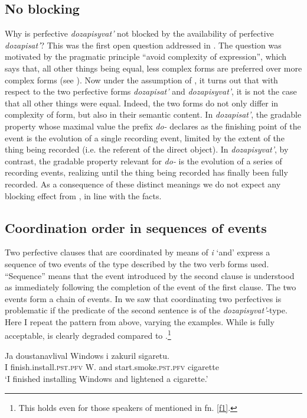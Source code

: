 \documentclass[output=paper,
colorlinks,
citecolor=brown,
newtxmath
]{langscibook}
\begin{document}
\subsection{No blocking}
Why is perfective \textit{dozapisyvat'} not blocked by the availability of perfective \textit{dozapisat'}? This was the first open question addressed in . The question was motivated by the pragmatic principle ``avoid complexity of expression'', which says that, all other things being equal, less complex forms are preferred over more complex forms (see ). Now under the assumption of , it turns out that with respect to the two perfective forms \textit{dozapisat'} and \textit{dozapisyvat'}, it is not the case that all other things were equal. Indeed, the two forms do not only differ in complexity of form, but also in their semantic content. In \textit{dozapisat'}, the gradable property whose maximal value the prefix \textit{do-} declares as the finishing point of the event is the evolution of a single recording event, limited by the extent of the thing being recorded (i.e. the referent of the direct object). In \textit{dozapisyvat'}, by contrast, the gradable property relevant for \textit{do-} is the evolution of a series of recording events, realizing until the thing being recorded has finally been fully recorded. As a consequence of these distinct meanings we do not expect any blocking effect from , in line with the facts.

\subsection{Coordination order in sequences of events}
Two perfective clauses that are coordinated by means of \textit{i} `and' express a sequence of two events of the type described by the two verb forms used. ``Sequence'' means that the event introduced by the second clause is understood as immediately following the completion of the event of the first clause. The two events form a chain of events. In  we saw that coordinating two perfectives is problematic if the predicate of the second sentence is of the \textit{dozapisyvat'}-type. Here I repeat the pattern from above, varying the examples. While  is fully acceptable,  is clearly degraded compared to .\footnote{This holds even for those speakers of  mentioned in fn. \ref{f1}.}


\ea\label{123}
\gll Ja doustanavlival Windows i zakuril sigaretu.\\
I {finish.install.}\textsc{pst.pfv} W. and {start.smoke.}\textsc{pst.pfv} cigarette\\
\glt `I finished installing Windows and lightened a cigarette.'
\z
\end{document}

